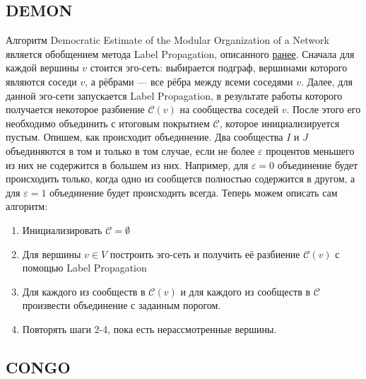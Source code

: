 \documentclass[12pt]{article}
\begin{document}
\subsection{DEMON}

Алгоритм Democratic Estimate of the Modular Organization of a Network \cite{demon} является обобщением метода Label Propagation, описанного \hyperref[sec:label_propagation]{ранее}. Сначала для каждой вершины $v$ стоится эго-сеть: выбирается подграф, вершинами которого являются соседи $v$, а рёбрами --- все рёбра между всеми соседями $v$. Далее, для данной эго-сети запускается Label Propagation, в результате работы которого получается некоторое разбиение $\mathcal{C}(v)$ на сообщества соседей $v$. После этого его необходимо объединить с итоговым покрытием $\mathcal{C}$, которое инициализируется пустым. Опишем, как происходит объединение. Два сообщества $I$ и $J$ объединяются в том и только в том случае, если не более $\varepsilon$ процентов меньшего из них не содержится в большем из них. Например, для $\varepsilon = 0$ объединение будет происходить только, когда одно из сообщетсв полностью содержится в другом, а для $\varepsilon = 1$ объединение будет происходить всегда. Теперь можем описать сам алгоритм:
\begin{enumerate}
\item Инициализировать $\mathcal{C} = \emptyset$
\item Для вершины $v \in V$ построить эго-сеть и получить её разбиение $\mathcal{C}(v)$ с помощью Label Propagation
\item Для каждого из сообществ в $\mathcal{C}(v)$ и для каждого из сообществ в $\mathcal{C}$ произвести объединение с заданным порогом.
\item Повторять шаги 2-4, пока есть нерассмотренные вершины.
\end{enumerate}

\subsection{CONGO}
\end{document}
